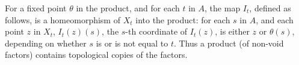 For a fixed point $\theta$ in the product, and for each $t$ in $A$, the map $I_t$, defined as follows, is a homeomorphism of $X_t$ into the product: for each $s$ in $A$, and each point $z$ in $X_t$, $I_t(z)(s)$, the $s$-th coordinate of $I_t(z)$, is either $z$ or $\theta(s)$, depending on whether $s$ is or is not equal to $t$. Thus a product (of non-void factors) contains topological copies of the factors.
